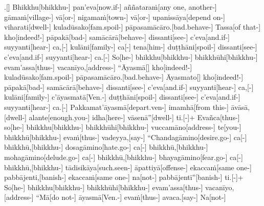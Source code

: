 \documentclass[12pt]{article}
\begin{document}
\begin{paracol}{2}
\begin{column}
\begin{flushleft}
.[] Bhikkhu[bhikkhu-] pan’eva[now.if-] aññataraṁ[any one, another-] gāmaṁ[village-] vā[or-] nigamaṁ[town-] vā[or-] upanissāya[depend on-] viharati[dwell-] kuladūsako[fam.spoil-] pāpasamācāro.[bad.behave-] Tassa[of that-] kho[indeed!-] pāpakā[bad-] samācārā[behave-] dissanti[see-] c’eva[and.if-\NUL{\GMU{}}] suyyanti[hear-] ca,[-\NUL{\GMU{}}] kulāni[family-] ca[-\NUL{\GMU{}}] tena[him-] duṭṭhāni[spoil-] dissanti[see-] c’eva[and.if-\NUL{\GMU{}}] suyyanti[hear-] ca.[-\NUL{\GMU{}}] So[he-] bhikkhu[bhikkhu-] bhikkhūhi[bhikkhu-] evam’assa[thus-] vacanīyo,[address-] “Āyasmā[] kho[indeed!-] kuladūsako[fam.spoil-] pāpasamācāro.[bad.behave-] Āyasmato[] kho[indeed!-] pāpakā[bad-] samācārā[behave-] dissanti[see-] c’eva[and.if-\NUL{\GMU{}}] suyyanti[hear-] ca,[-\NUL{\GMU{}}] kulāni[family-] c’āyasmatā[Ven.-] duṭṭhāni[spoil-] dissanti[see-] c’eva[and.if-\NUL{\GMU{}}] suyyanti[hear-] ca.[-\NUL{\GMU{}}] Pakkamat’āyasmā[depart.ven-] imamhā[from this-] āvāsā,[dwell-] alante[enough.you-] idha[here-] vāsenā”[dwell-] ti.[-\NUL{\GMU{}}]+ Evañca[thus-] so[he-] bhikkhu[bhikkhu-] bhikkhūhi[bhikkhu-] vuccamāno[address-] te[you-] bhikkhū[bhikkhu-] evaṁ[thus-] vadeyya,[say-] “Chandagāmino[desire.go-] ca[-\NUL{\GMU{}}] bhikkhū,[bhikkhu-] dosagāmino[hate.go-] ca[-\NUL{\GMU{}}] bhikkhū,[bhikkhu-] mohagāmino[delude.go-] ca[-\NUL{\GMU{}}] bhikkhū,[bhikkhu-] bhayagāmino[fear.go-] ca[-\NUL{\GMU{}}] bhikkhū,[bhikkhu-] tādisikāya[such.seen-] āpattiyā[offense-] ekaccaṁ[same one-] pabbājenti,[banish-] ekaccaṁ[same one-] na[not-] pabbājentī”[banish-] ti.[-\NUL{\GMU{}}]+ So[he-] bhikkhu[bhikkhu-] bhikkhūhi[bhikkhu-] evam’assa[thus-] vacanīyo,[address-] “Mā[do not-] āyasmā[Ven.-] evaṁ[thus-] avaca.[say-\NUL{\GMU{}}] Na[not-] 
\end{flushleft}
\end{column}
\end{paracol}
\end{document}
